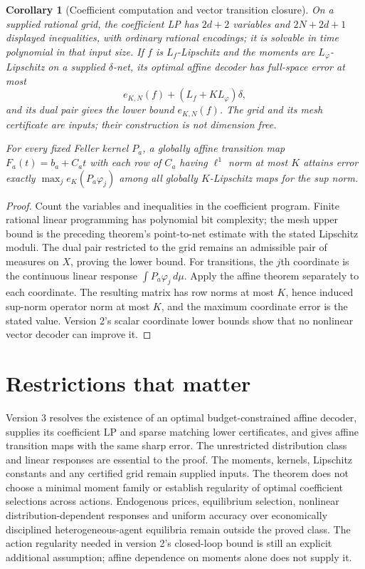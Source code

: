 \documentclass[11pt]{article}
\newtheorem{corollary}{Corollary}
\theoremstyle{definition}
\begin{document}
\begin{corollary}[Coefficient computation and vector transition closure]
On a supplied rational grid, the coefficient LP has $2d+2$ variables and
$2N+2d+1$ displayed inequalities, with ordinary rational encodings; it is
solvable in time polynomial in that input size. If $f$ is $L_f$-Lipschitz
and the moments are $L_\varphi$-Lipschitz on a supplied $\delta$-net, its
optimal affine decoder has full-space error at most
\[
 e_{K,N}(f)+(L_f+KL_\varphi)\delta,
\]
and its dual pair gives the lower bound $e_{K,N}(f)$. The grid and its
mesh certificate are inputs; their construction is not dimension free.

For every fixed Feller kernel $P_a$, a globally affine transition map
$F_a(t)=b_a+C_at$ with each row of $C_a$ having $\ell^1$ norm at most
$K$ attains error exactly
$\max_j e_K(P_a\varphi_j)$ among all globally $K$-Lipschitz maps for
the sup norm.
\end{corollary}
\begin{proof}
Count the variables and inequalities in the coefficient program. Finite
rational linear programming has polynomial bit complexity; the mesh upper
bound is the preceding theorem's point-to-net estimate with the stated
Lipschitz moduli. The dual pair restricted to the grid remains an admissible
pair of measures on $X$, proving the lower bound.
For transitions, the $j$th coordinate is the continuous linear response
$\int P_a\varphi_j\,d\mu$. Apply the affine theorem separately to each
coordinate. The resulting matrix has row norms at most $K$, hence induced
sup-norm operator norm at most $K$, and the maximum coordinate error is
the stated value. Version 2's scalar coordinate lower bounds show that
no nonlinear vector decoder can improve it.
\end{proof}

\section*{Restrictions that matter}
Version 3 resolves the existence of an optimal budget-constrained affine
decoder, supplies its coefficient LP and sparse matching lower certificates,
and gives affine transition maps with the same sharp error. The unrestricted
distribution class and linear responses are essential to the proof. The
moments, kernels, Lipschitz constants and any certified grid remain supplied
inputs. The theorem does not choose a minimal moment family or establish
regularity of optimal coefficient selections across actions. Endogenous
prices, equilibrium selection, nonlinear distribution-dependent responses
and uniform accuracy over economically disciplined heterogeneous-agent
equilibria remain outside the proved class. The action regularity needed
in version 2's closed-loop bound is still an explicit additional assumption;
affine dependence on moments alone does not supply it.
\end{document}
